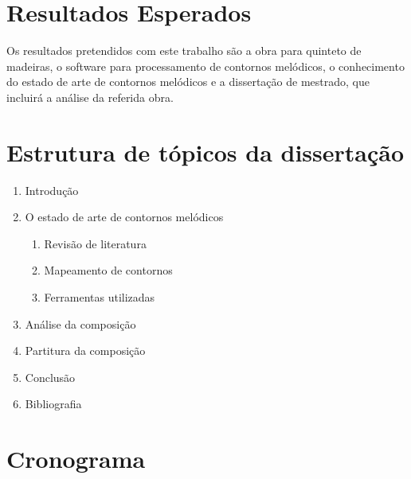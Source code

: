 \documentclass{article}
\begin{document}
\section{Resultados Esperados}
\label{sec:resultados-esperados}

Os resultados pretendidos com este trabalho são a obra para quinteto
de madeiras, o software para processamento de contornos melódicos, o
conhecimento do estado de arte de contornos melódicos e a dissertação
de mestrado, que incluirá a análise da referida obra.

\section{Estrutura de tópicos da dissertação}
\label{sec:estrutura-de-topicos}

\begin{enumerate}
\item Introdução
\item O estado de arte de contornos melódicos
  \begin{enumerate}
  \item Revisão de literatura
  \item Mapeamento de contornos
  \item Ferramentas utilizadas
  \end{enumerate}
\item Análise da composição
\item Partitura da composição
\item Conclusão
\item Bibliografia
\end{enumerate}

\newpage
\section{Cronograma}
\label{sec:cronograma}
\end{document}
